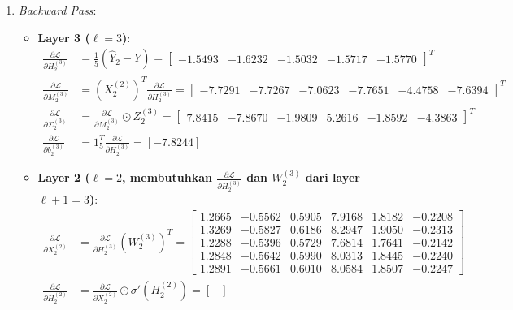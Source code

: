 \documentclass[11pt,a4paper]{article}
\def\mathbf#1{#1}%
\theoremstyle{plain}
\theoremstyle{definition}
\theoremstyle{remark}
\begin{document}
\begin{enumerate}
    \item \textit{Backward Pass}:
    \begin{itemize}
        \item \textbf{Layer 3 ($\ell = 3$)}:
        \begin{align}
            \frac{\partial \mathcal{L}}{\partial H^{(3)}_2} &= \frac{1}{5}\left(\hat{Y}_2 - Y\right) = \begin{bmatrix} -1.5493 & -1.6232 & -1.5032 & -1.5717 & -1.5770 \end{bmatrix}^T \\[0.2em]
            \frac{\partial \mathcal{L}}{\partial M^{(3)}_2} &= \left(X^{(2)}_2\right)^T \frac{\partial \mathcal{L}}{\partial H^{(3)}_2} = \begin{bmatrix} -7.7291 & -7.7267 & -7.0623 & -7.7651 & -4.4758 & -7.6394 \end{bmatrix}^T \\[0.2em]
            \frac{\partial \mathcal{L}}{\partial \Sigma^{(3)}_2} &= \frac{\partial \mathcal{L}}{\partial M^{(3)}_2} \odot Z^{(3)}_2 = \begin{bmatrix} 7.8415 & -7.8670 & -1.9809 & 5.2616 & -1.8592 & -4.3863 \end{bmatrix}^T \\[0.2em]
            \frac{\partial \mathcal{L}}{\partial \mathbf{b}^{(3)}_2} &= \mathbf{1}_5^T \frac{\partial \mathcal{L}}{\partial H^{(3)}_2} = [-7.8244]
        \end{align}
        \item \textbf{Layer 2 ($\ell = 2$, membutuhkan $\frac{\partial \mathcal{L}}{\partial H^{(3)}_2}$ dan $W^{(3)}_2$ dari layer $\ell+1 = 3$)}:
        \begin{align}
            \frac{\partial \mathcal{L}}{\partial X^{(2)}_2} &= \frac{\partial \mathcal{L}}{\partial H^{(3)}_2} \left(W^{(3)}_2\right)^T = \begin{bmatrix}
                1.2665 & -0.5562 & 0.5905 & 7.9168 & 1.8182 & -0.2208 \\
                1.3269 & -0.5827 & 0.6186 & 8.2947 & 1.9050 & -0.2313 \\
                1.2288 & -0.5396 & 0.5729 & 7.6814 & 1.7641 & -0.2142 \\
                1.2848 & -0.5642 & 0.5990 & 8.0313 & 1.8445 & -0.2240 \\
                1.2891 & -0.5661 & 0.6010 & 8.0584 & 1.8507 & -0.2247
            \end{bmatrix} \\[0.2em]
            \frac{\partial \mathcal{L}}{\partial H^{(2)}_2} &= \frac{\partial \mathcal{L}}{\partial X^{(2)}_2} \odot \sigma'\!\left(H^{(2)}_2\right) = \begin{bmatrix}

\end{bmatrix}
\end{align}
\end{itemize}
\end{enumerate}
\end{document}
